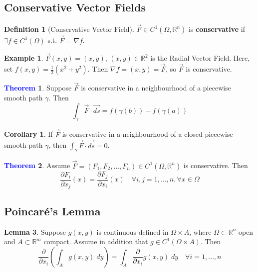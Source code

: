 \documentclass[11pt]{article}
\theoremstyle{definition}
\newtheorem{exmp}{Example}[section]
\theoremstyle{definition}
\newcommand{\R}[0]{\mathbb{R}}
\newtheorem{theorem}{\textcolor{blue}{Theorem}}
\newtheorem{corollary}{Corollary}
\newtheorem{lemma}[theorem]{Lemma}
\theoremstyle{definition}
\newtheorem{definition}{\textcolor{OliveGreen}{Definition}}
\theoremstyle{remark}
\begin{document}
\subsection{Conservative Vector Fields}

\begin{definition}[Conservative Vector Field]
    $\vec{F} \in C^1(\Omega, \R^n)$ is \textbf{conservative} if $\exists f \in C^1(\Omega)$ s.t.
    $\vec{F} = \nabla f$. 
\end{definition}

\begin{exmp}
    $\vec{F}(x,y) = (x,y)$, $(x, y) \in \R^2$ is the Radial Vector Field. Here, set $f(x,y) = \frac{1}{2}(x^2 + y^2)$.
    Then $\nabla f = (x, y) = \vec{F}$, so $\vec{F}$ is conservative.       
\end{exmp}

\begin{theorem}
    Suppose $\vec{F}$ is conservative in a neighbourhood of a piecewise smooth path $\gamma$.
    Then 
    \[
        \int_{\gamma} \vec{F} \cdot \vec{ds} = f(\gamma(b)) - f(\gamma(a))
    \]   
\end{theorem}
\begin{corollary}
    If $\vec{F}$ is conservative in a neighbourhood of a closed piecewise smooth path $\gamma$, then $\int_{\gamma} \vec{F} \cdot \vec{ds} = 0$.
\end{corollary}

\begin{theorem}
    Assume $\vec{F} = (F_1, F_2, \ldots, F_n) \in C^1(\Omega, \R^n)$ is conservative. Then
    \[
        \frac{\partial F_i}{\partial x_j}(x) = \frac{\partial F_j}{\partial x_i}(x) \quad \forall i, j = 1, \dots, n, \forall x \in \Omega
    \]   
\end{theorem}

\subsection{Poincaré's Lemma}

\begin{lemma}
    Suppose $g(x,y)$ is continuous defined in $\Omega \times A$, where $\Omega \subset \R^n$ open and
    $A \subset \R^m$ compact. Assume in addition that $g \in C^1(\Omega \times A)$. Then
    \[
        \frac{\partial}{\partial x_i}\left(\int_{A} g(x,y) \; dy \right) = \int_A \frac{\partial }{\partial x_i}g(x,y) \; dy \quad \forall i = 1, \dots, n
    \]      
\end{lemma}
\end{document}
